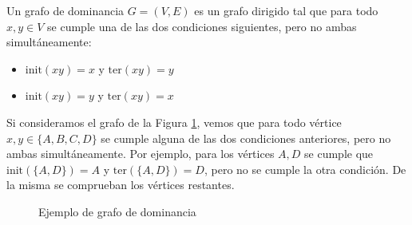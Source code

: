 \begin{defi} \label{def:dominancia}
Un grafo de dominancia $G=(V,E)$ es un grafo dirigido tal que para todo $x,y \in V$ se cumple una de las dos condiciones siguientes, pero no ambas simultáneamente:

\begin{itemize}
\item $\mathrm{init}(xy) = x$ \quad y \quad $\mathrm{ter}(xy) = y$
\item $\mathrm{init}(xy) = y$ \quad y \quad $\mathrm{ter}(xy) = x$ 
\end{itemize}
\end{defi}

\begin{ejemplo}
Si consideramos el grafo de la Figura \ref{fig:grafo_dominancia}, vemos que para todo vértice $x,y \in \{A, B, C, D\}$ se cumple alguna de las dos condiciones anteriores, pero no ambas simultáneamente. Por ejemplo, para los vértices $A, D$ se cumple que $\mathrm{init}(\{A,D\}) = A$ y $\mathrm{ter}(\{A,D\}) = D$, pero no se cumple la otra condición. De la misma se comprueban los vértices restantes.   

\begin{figure}[h]
\centering
\ejemplografodominancia
\caption{Ejemplo de grafo de dominancia}
\label{fig:grafo_dominancia}
\end{figure}
\end{ejemplo}